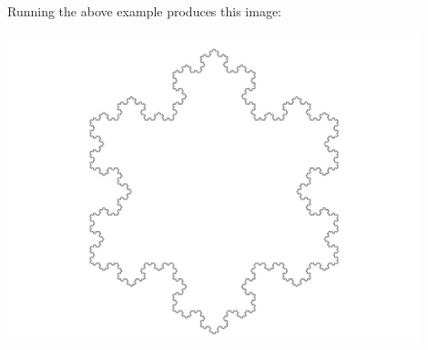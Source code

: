 Running the above example produces this image:

\begin{center}
\includegraphics[width=12cm]{pics/koch}
\end{center}

